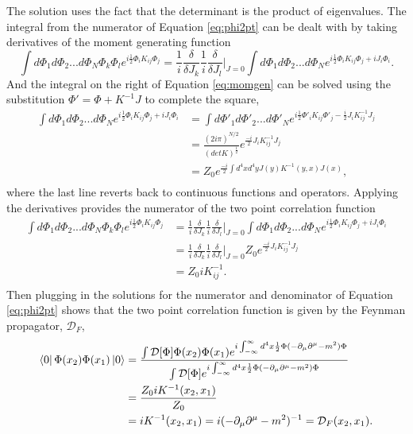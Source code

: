 The solution uses the fact that the determinant is the product of eigenvalues. The integral from the numerator of Equation \ref{eq:phi2pt} can be dealt with by taking derivatives of the moment generating function 
\begin{equation}
\label{eq:momgen}
\int d\Phi_1 d\Phi_2 ... d\Phi_N \Phi_k\Phi_l e^{i\frac{1}{2}\Phi_{i} K_{ij} \Phi_{j}} 
= \frac{1}{i}\frac{\delta}{\delta J_k}\frac{1}{i}\frac{\delta}{\delta J_l}\Big|_{J=0} 
\int d\Phi_1 d\Phi_2 ... d\Phi_N e^{i\frac{1}{2}\Phi_{i} K_{ij} \Phi_{j} + iJ_i\Phi_i}. 
\end{equation}
And the integral on the right of Equation \ref{eq:momgen} can be solved using the substitution $\Phi' = \Phi + K^{-1}J$ to complete the square, 
\begin{equation}
\begin{split}
\int d\Phi_1 d\Phi_2 ... d\Phi_N e^{i\frac{1}{2}\Phi_{i} K_{ij} \Phi_{j} + iJ_i\Phi_i} 
&= \int d\Phi'_1 d\Phi'_2 ... d\Phi'_N e^{i\frac{1}{2}\Phi'_{i} K_{ij} \Phi'_{j} - \frac{i}{2}J_i K^{-1}_{ij} J_j}\\ 
&= \frac{\left( 2i\pi \right)^{N/2}}{ \left( detK \right)^\frac{1}{2}}e^{\frac{-i}{2}J_i K^{-1}_{ij} J_j}\\
&= Z_0e^{\frac{-i}{2}\int d^4x d^4y J(y) K^{-1}(y,x) J(x)},\\
\end{split}
\end{equation}
where the last line reverts back to continuous functions and operators. Applying the derivatives provides the numerator of the two point correlation function 
\begin{equation}
\begin{split}
\int d\Phi_1 d\Phi_2 ... d\Phi_N \Phi_k\Phi_l e^{i\frac{1}{2}\Phi_{i} K_{ij} \Phi_{j}} 
& = \frac{1}{i}\frac{\delta}{\delta J_k}\frac{1}{i}\frac{\delta}{\delta J_l}\Big|_{J=0} \int d\Phi_1 d\Phi_2 ... d\Phi_N e^{i\frac{1}{2}\Phi_{i} K_{ij} \Phi_{j} + iJ_i\Phi_i} \\
& = \frac{1}{i}\frac{\delta}{\delta J_k}\frac{1}{i}\frac{\delta}{\delta J_l}\Big|_{J=0} Z_0e^{\frac{-i}{2}J_i K^{-1}_{ij} J_j} \\ 
& = Z_0 iK^{-1}_{ij}. \\
\end{split}
\end{equation}
Then plugging in the solutions for the numerator and denominator of Equation \ref{eq:phi2pt} shows that the two point correlation function is given by the Feynman propagator, $\mathcal{D}_F$, 
\begin{equation}
\begin{split}
\bra{0}\Phi(x_2)\Phi(x_1)\ket{0} &= 
\frac{\int \mathcal{D}[\Phi]\Phi(x_2)\Phi(x_1)e^{i\int_{-\infty}^{\infty} d^4x \frac{1}{2}\Phi (-\partial_\mu\partial^\mu - m^2)\Phi}}
{\int \mathcal{D}[\Phi]e^{i\int_{-\infty}^{\infty} d^4x \frac{1}{2}\Phi (-\partial_\mu\partial^\mu - m^2)\Phi}} \\
&= \frac{Z_0 iK^{-1}(x_2,x_1)}{Z_0} \\
&= iK^{-1}(x_2,x_1) = i(-\partial_\mu\partial^\mu - m^2)^{-1} = \mathcal{D}_F(x_2,x_1).\\ 
\end{split}
\end{equation}
